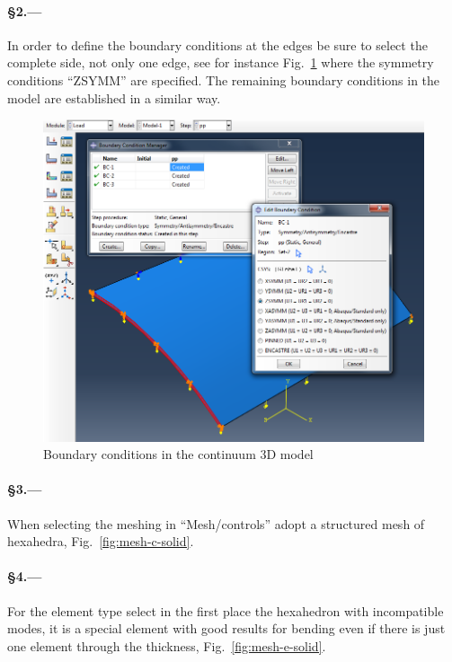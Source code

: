 \documentclass[english,a4paper,12pt]{article}
\begin{document}
\paragraph{\S2.---}
In order to define the boundary conditions at the edges be sure to select the complete side, not only one edge, see for instance Fig.~\ref{fig:load-solid} where the symmetry conditions ``ZSYMM'' are specified.
The remaining boundary conditions in the model are established in a similar way.
\begin{figure}[h!tp]
\centering
\includegraphics[scale=0.3]{capturas/41-load-solid.png}
\caption{Boundary conditions in the continuum 3D model}
\label{fig:load-solid}
\end{figure}
\paragraph{\S3.---}
When selecting the meshing in ``Mesh/controls'' adopt a structured mesh of hexahedra, Fig.~\ref{fig:mesh-c-solid}.
\paragraph{\S4.---}
For the element type select in the first place the hexahedron with incompatible modes, it is a special element with good results for bending even if there is just one element through the thickness, Fig.~\ref{fig:mesh-e-solid}.
\end{document}
